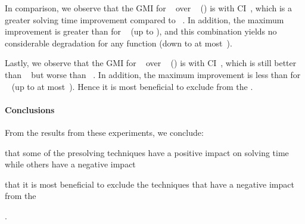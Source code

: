 In comparison, we observe that the \gls{GMI} for ~ over ~
() is \printGMI{%
  \SolvTechDisableBadPresolvingPrePlusSolvingTimeSpeedupPrePlusSolvingTimeRegularSpeedupGmean%
} with \gls{CI}~\printGMICI{%
  \SolvTechDisableBadPresolvingPrePlusSolvingTimeSpeedupPrePlusSolvingTimeRegularSpeedupCiMin%
}{%
  \SolvTechDisableBadPresolvingPrePlusSolvingTimeSpeedupPrePlusSolvingTimeRegularSpeedupCiMax%
}, which is a greater solving time improvement compared to ~.
%
In addition, the maximum improvement is greater than for ~ (up to
\printSpeedup{%
  \SolvTechDisableBadPresolvingPrePlusSolvingTimeSpeedupPrePlusSolvingTimeZeroCenteredSpeedupMax%
}), and this combination yields no considerable degradation for any
\gls{function} (down to at
most~\printSpeedup{%
  \SolvTechDisableBadPresolvingPrePlusSolvingTimeSpeedupPrePlusSolvingTimeZeroCenteredSpeedupMin%
}).

Lastly, we observe that the \gls{GMI} for ~ over ~
() is \printGMI{%
  \SolvTechDisableAllPresolvingPrePlusSolvingTimeSpeedupPrePlusSolvingTimeRegularSpeedupGmean%
} with \gls{CI}~\printGMICI{%
  \SolvTechDisableAllPresolvingPrePlusSolvingTimeSpeedupPrePlusSolvingTimeRegularSpeedupCiMin%
}{%
  \SolvTechDisableAllPresolvingPrePlusSolvingTimeSpeedupPrePlusSolvingTimeRegularSpeedupCiMax%
}, which is still better than ~ but worse than ~.
%
In addition, the maximum improvement is less than for ~ (up to at
most~\printSpeedup{%
  \SolvTechDisableAllPresolvingPrePlusSolvingTimeSpeedupPrePlusSolvingTimeZeroCenteredSpeedupMax%
}).
%
Hence it is most beneficial to exclude
 from the
.


\paragraph{Conclusions}

From the results from these experiments, we conclude:
%
\begin{enumerate*}[label=(\roman*), itemjoin={;\ }, itemjoin*={; and\ }]
  \item that some of the \gls{presolving} techniques have a positive impact on
    solving time while others have a negative impact
  \item that it is most beneficial to exclude the techniques that have a
    negative impact from the 
\end{enumerate*}.


